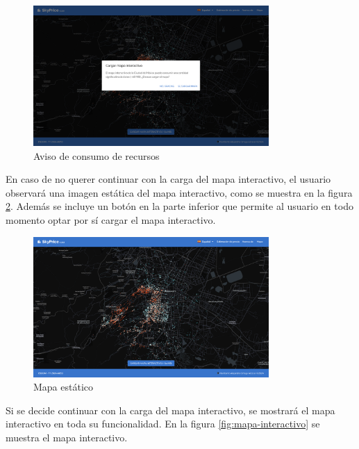 \begin{figure}[H]
    \centering
    \includegraphics[width=0.8\textwidth]{imagenes/05-mapa-interactivo/aviso-consumo-recursos.png}
    \caption{Aviso de consumo de recursos}
    \label{fig:aviso-consumo-recursos}
\end{figure}

En caso de no querer continuar con la carga del mapa interactivo, el usuario
observará una imagen estática del mapa interactivo, como se muestra en la
figura \ref{fig:mapa-estatico}. Además se incluye un botón en la parte inferior
que permite al usuario en todo momento optar por sí cargar el mapa interactivo.

\begin{figure}[H]
    \centering
    \includegraphics[width=0.8\textwidth]{imagenes/05-mapa-interactivo/mapa-estatico.png}
    \caption{Mapa estático}
    \label{fig:mapa-estatico}
\end{figure}

Si se decide continuar con la carga del mapa interactivo, se mostrará el mapa
interactivo en toda su funcionalidad. En la figura \ref{fig:mapa-interactivo}
se muestra el mapa interactivo.

